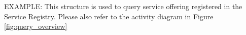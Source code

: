\documentclass[a4paper]{arrowhead}
\newcommand{\pref}[1]{{\textcolor{ArrowheadGrey}{\hyperref[sec:model:primitives:#1]{#1}}}}
\begin{document}



\color{red} 


EXAMPLE: This structure is used to query service offering registered in
the Service Registry. Please also refer to the activity diagram in
Figure \ref{fig:query_overview} \color{black}

\end{document}
